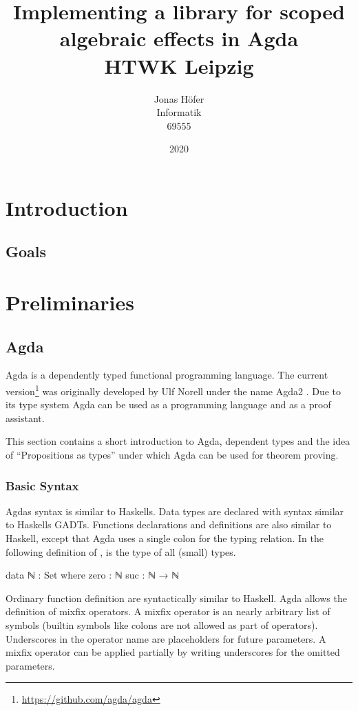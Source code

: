 \documentclass[10pt,a4paper,twoside]{report}
\title{
  {\huge\textbf{Implementing a library for scoped algebraic effects in Agda}}\\
  {\large HTWK Leipzig}
}
\author{
  {Jonas Höfer}\\
  {Informatik}\\
  {69555}
}
\date{2020}
\begin{document}
\maketitle
\begin{abstract}
\end{abstract}

\tableofcontents

\chapter{Introduction}
\section{Goals}
\chapter{Preliminaries}
\section{Agda}

Agda is a dependently typed functional programming language.
The current version\footnote{\url{https://github.com/agda/agda}} was originally
developed by Ulf Norell under the name Agda2 \cite{norell:thesis}.
Due to its type system Agda can be used as a programming language and as a proof
assistant.

This section contains a short introduction to Agda, dependent types and the idea
of ``Propositions as types'' under which Agda can be used for theorem proving.

\subsection{Basic Syntax}

Agdas syntax is similar to Haskells.
Data types are declared with syntax similar to Haskells GADTs.
Functions declarations and definitions are also similar to Haskell, except that
Agda uses a single colon for the typing relation.
In the following definition of ,  is the type
of all (small) types.

\begin{code}
data ℕ : Set where
  zero  : ℕ
  suc   : ℕ → ℕ
\end{code}
Ordinary function definition are syntactically similar to Haskell.
Agda allows the definition of mixfix operators.
A mixfix operator is an nearly arbitrary list of symbols (builtin symbols like
colons are not allowed as part of operators).
Underscores in the operator name are placeholders for future parameters.
A mixfix operator can be applied partially by writing underscores for the
omitted parameters.
\end{document}
